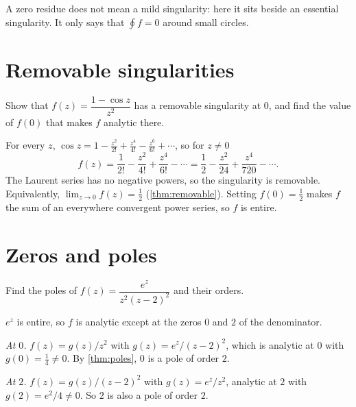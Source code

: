 \begin{remark}
  A zero residue does not mean a mild singularity: here it sits beside an
  essential singularity. It only says that $\oint f = 0$ around small circles.
\end{remark}

\section{Removable singularities}\label{sec:removable}



\begin{exercise}\label{ex:one-minus-cos}
  Show that $f(z) = \dfrac{1 - \cos z}{z^2}$ has a removable singularity at
  $0$, and find the value of $f(0)$ that makes $f$ analytic there.
\end{exercise}

\begin{solution}
  For every $z$,
  $\cos z = 1 - \frac{z^2}{2!} + \frac{z^4}{4!} - \frac{z^6}{6!} + \dotsb$,
  so for $z \neq 0$
  \[
    f(z) = \frac{1}{2!} - \frac{z^2}{4!} + \frac{z^4}{6!} - \dotsb
    = \frac12 - \frac{z^2}{24} + \frac{z^4}{720} - \dotsb.
  \]
  The Laurent series has no negative powers, so the singularity is removable.
  Equivalently, $\lim_{z \to 0} f(z) = \frac12$ (\cref{thm:removable}).
  Setting $f(0) = \frac12$ makes $f$ the sum of an everywhere convergent power
  series, so $f$ is entire.
\end{solution}

\section{Zeros and poles}\label{sec:poles}



\begin{exercise}\label{ex:double-poles}
  Find the poles of $f(z) = \dfrac{e^z}{z^2 (z - 2)^2}$ and their orders.
\end{exercise}

\begin{solution}
  $e^z$ is entire, so $f$ is analytic except at the zeros $0$ and $2$ of the
  denominator.

  \emph{At $0$.} $f(z) = g(z) / z^2$ with $g(z) = e^z / (z - 2)^2$, which is
  analytic at $0$ with $g(0) = \frac14 \neq 0$. By \cref{thm:poles}, $0$ is a
  pole of order $2$.

  \emph{At $2$.} $f(z) = g(z) / (z - 2)^2$ with $g(z) = e^z / z^2$, analytic
  at $2$ with $g(2) = e^2 / 4 \neq 0$. So $2$ is also a pole of order $2$.
\end{solution}

